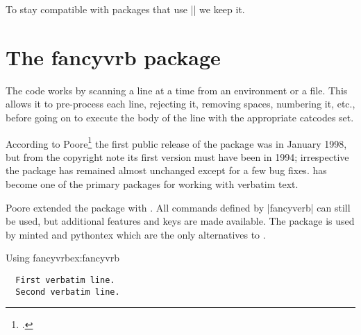 %
\begin{macro}{\@verb}
\begin{teX}
\def\@verb{\@vobeyspaces \frenchspacing \@sverb}
\end{teX}
\end{macro}
%
\begin{macro}{\verbatim@nolig@list}

\begin{teX}
\def\verbatim@nolig@list{\do\`\do\<\do\>\do\,\do\'\do\-}
\end{teX}
\end{macro}
%
\begin{macro}{\do@noligs}
\begin{teX}
\def\do@noligs#1{%
  \catcode`#1\active
  \begingroup
     \lccode`\~`#1\relax
     \lowercase{\endgroup\def~{\leavevmode\kern\z@\char`#1}}}
\end{teX}
\end{macro}
%
\begin{macro}{\@noligs}
To stay compatible with packages that use |\@noligs| we keep it.
\begin{teX}
\def\@noligs{\let\do\do@noligs \verbatim@nolig@list}
\end{teX}
\end{macro}



\section{The fancyvrb package}


The code works by scanning a line at a time from an environment or a file. This allows it to pre-process each line, rejecting it, removing spaces, numbering it, etc., before going on to execute the body of the line with the appropriate catcodes set.

According to Poore\footcite{poore} the first public release of the package was in January 1998, but from the copyright note its first version must have been in 1994; irrespective the package has remained almost  unchanged except for a few bug fixes.  has become one of the primary \latex packages for working with verbatim text.

Poore extended the package with . All commands defined by |fancyverb| can still be used, but additional
features and keys are made available. The package is used by minted and pythontex which are the only alternatives to
.


\begin{texexample}{Using fancyvrb}{ex:fancyvrb}
\begin{Verbatim}
  First verbatim line.
  Second verbatim line.
\end{Verbatim}
\end{texexample}

